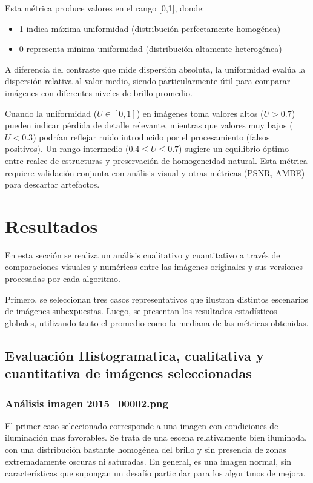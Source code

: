 \documentclass[sigchi]{acmart}
\begin{document}
Esta métrica produce valores en el rango [0,1], donde:
\begin{itemize}
	\item 1 indica máxima uniformidad (distribución perfectamente homogénea)
	\item 0 representa mínima uniformidad (distribución altamente heterogénea)
\end{itemize}

A diferencia del contraste que mide dispersión absoluta, la uniformidad evalúa la dispersión
relativa al valor medio, siendo particularmente útil para comparar imágenes con diferentes
niveles de brillo promedio.

Cuando la uniformidad ($U \in [0,1]$) en imágenes toma valores altos
($U > 0.7$) pueden indicar pérdida de detalle relevante, mientras que valores muy bajos ($U <
	0.3$) podrían reflejar ruido introducido por el procesamiento (falsos positivos). Un rango
intermedio ($0.4 \leq U \leq 0.7$) sugiere un equilibrio óptimo entre realce de estructuras y
preservación de homogeneidad natural. Esta métrica requiere validación conjunta con análisis
visual y otras métricas (PSNR, AMBE) para descartar artefactos.

\section{Resultados}
\label{sec:resultados}

En esta sección se realiza un análisis cualitativo y cuantitativo a través de comparaciones
visuales y numéricas entre las imágenes originales y sus versiones procesadas por cada
algoritmo.

Primero, se seleccionan tres casos representativos que ilustran distintos escenarios de
imágenes subexpuestas. Luego, se presentan los resultados estadísticos globales, utilizando
tanto el promedio como la mediana de las métricas obtenidas.

\subsection{Evaluación Histogramatica, cualitativa y cuantitativa de imágenes seleccionadas}

\subsubsection{Análisis imagen 2015\_00002.png}

El primer caso seleccionado corresponde a una imagen con condiciones de iluminación mas
favorables. Se trata de una escena relativamente bien iluminada, con una distribución bastante
homogénea del brillo y sin presencia de zonas extremadamente oscuras ni saturadas. En general,
es una imagen normal, sin características que supongan un desafío particular para los
algoritmos de mejora.
\end{document}
